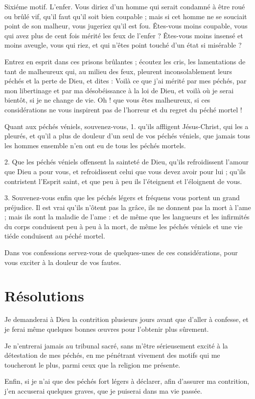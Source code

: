 \documentclass[instructions.tex]{subfiles}
\begin{document}
Sixiéme motif. L'enfer. Vous diriez d'un homme qui serait condamné à être roué ou brûlé vif, qu'il faut qu'il soit bien coupable ; mais si cet homme ne se souciait point de son malheur, vous jugeriez qu'il est fou. Êtes-vous moins coupable, vous qui avez plus de cent fois mérité les feux de l'enfer ? Êtes-vous moins insensé et moins aveugle, vous qui riez, et qui n'êtes point touché d'un état si misérable ?

Entrez en esprit dans ces prisons brûlantes ; écoutez les cris, les lamentations de tant de malheureux qui, au milieu des feux, pleurent inconsolablement leurs péchés et la perte de Dieu, et dites : Voilà ce que j'ai mérité par mes péchés, par mon libertinage et par ma désobéissance à la loi de Dieu, et voilà où je serai bientôt, si je ne change de vie. Oh ! que vous êtes malheureux, si ces considérations ne vous inspirent pas de l'horreur et du regret du péché mortel !

\secundo Quant aux péchés véniels, souvenez-vous, 1. qu'ils affligent Jésus-Christ, qui les a pleurés, et qu'il a plus de douleur d'un seul de vos péchés véniels, que jamais tous les hommes ensemble n'en ont eu de tous les péchés mortels.

2. Que les péchés véniels offensent la sainteté de Dieu, qu'ils refroidissent l'amour que Dieu a pour vous, et refroidissent celui que vous devez avoir pour lui ; qu'ils contristent l'Esprit saint, et que peu à peu ils l'éteignent et l'éloignent de vous.

3. Souvenez-vous enfin que les péchés légers et fréquens vous portent un grand préjudice. Il est vrai qu'ils n'ôtent pas la grâce, ils ne donnent pas la mort à l'ame ; mais ils sont la maladie de l'ame : et de même que les langueurs et les infirmités du corps conduisent peu à peu à la mort, de même les péchés véniels et une vie tiéde conduisent au péché mortel.

Dans vos confessions servez-vous de quelques-unes de ces considérations, pour vous exciter à la douleur de vos fautes.
 
\section{Résolutions}
 
\primo Je demanderai à Dieu la contrition plusieurs jours avant que d'aller à confesse, et je ferai même quelques bonnes œuvres pour l'obtenir plus sûrement.

\secundo Je n'entrerai jamais au tribunal sacré, sans m'être sérieusement excité à la détestation de mes péchés, en me pénétrant vivement des motifs qui me toucheront le plus, parmi ceux que la religion me présente.

\tertio Enfin, si je n'ai que des péchés fort légers à déclarer, afin d'assurer ma contrition, j'en accuserai quelques graves, que je puiserai dans ma vie passée. 

 
\end{document}
